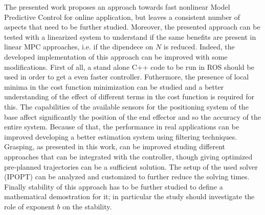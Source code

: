 The presented work proposes an approach towards fast nonlinear Model Predictive Control for online application, but leaves a consistent number of aspects that need to be further studied. Moreover, the presented approach can be tested with a linearized system to understand if the same benefits are present in linear MPC approaches, i.e. if the dipendece on $N$ is reduced. Indeed, the developed implementation of this approach can be improved with some modifications. First of all, a stand alone C++ code to be run in ROS should be used in order to get a even faster controller. Futhermore, the presence of local minima in the cost function minimization can be studied and a better understanding of the effect of different terms in the cost function is required for this. The capabilities of the available sensors for the positioning system of the base affect significantly the position of the end effector and so the accuracy of the entire system. Because of that, the performance in real applications can be improved developing a better estimation system using filtering techniques. Grasping, as presented in this work, can be improved studing different approaches that can be integrated with the controller, though giving optimized pre-planned trajectories can be a sufficient solution. The setup of the used solver (IPOPT) can be analyzed and customized to further reduce the solving times. \\ 
Finally stability of this approach has to be further studied to define a mathematical demostration for it; in particular the study should investigate the role of exponent $b$ on the stability.



